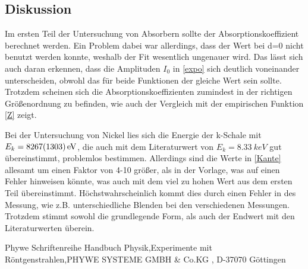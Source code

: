 \documentclass[
	a4paper,
	12pt,
	pagesize,
	ngerman
]{scrartcl}
\begin{document}
\subsection{Diskussion}
Im ersten Teil der Untersuchung von Absorbern sollte der Absorptionskoeffizient berechnet werden. Ein Problem dabei war allerdings, dass der Wert bei d=0 nicht benutzt werden konnte, weshalb der Fit wesentlich ungenauer wird. Das lässt sich auch daran erkennen, dass die Amplituden $I_{0}$ in \cref{expo} sich deutlich voneinander unterscheiden, obwohl das für beide Funktionen der gleiche Wert sein sollte. Trotzdem scheinen sich die Absorptionskoeffizienten zumindest in der richtigen Größenordnung zu befinden, wie auch der Vergleich mit der empirischen Funktion \cref{Z} zeigt.

Bei der Untersuchung von Nickel lies sich die Energie der k-Schale mit $E_{k} = \SI{8267 \pm 1303}{eV}$, die auch mit dem Literaturwert von $E_{k} = \SI{8,33}{keV}$ gut übereinstimmt, problemlos bestimmen. Allerdings sind die Werte in \cref{Kante} allesamt um einen Faktor von 4-10 größer, als in der Vorlage, was auf einen Fehler hinweisen könnte, was auch mit dem viel zu hohen Wert aus dem ersten Teil übereinstimmt. Höchstwahrscheinlich kommt dies durch einen Fehler in des Messung, wie z.B. unterschiedliche Blenden bei den verschiedenen Messungen. Trotzdem stimmt sowohl die grundlegende Form, als auch der Endwert mit den Literaturwerten überein. 
\begin{thebibliography}{9}
Phywe Schriftenreihe Handbuch Physik,Experimente mit Röntgenstrahlen,PHYWE SYSTEME GMBH \& Co.KG , D-37070 Göttingen
 \end{thebibliography}
\end{document}

